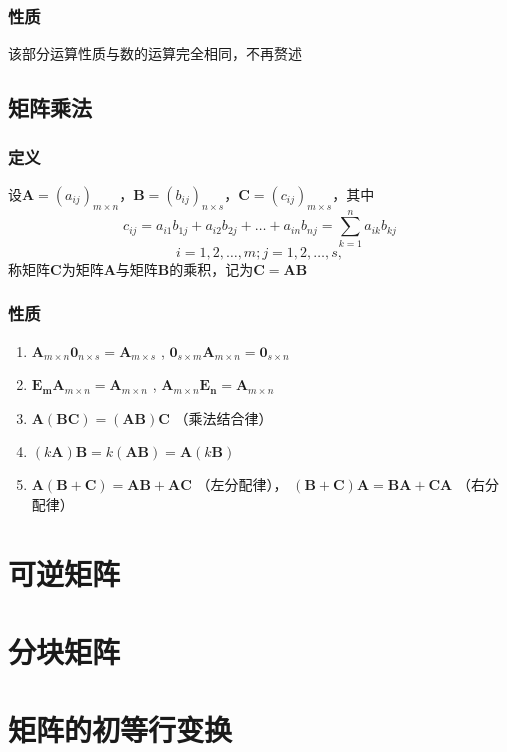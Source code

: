 \documentclass[UTF-8,a4paper]{ctexart}
\begin{document}
\subsubsection{性质} 该部分运算性质与数的运算完全相同，不再赘述
\subsection{矩阵乘法}
\subsubsection{定义}
设\(\mathbf{A}=(a_{ij})_{m\times n}\)，\(\mathbf{B}=(b_{ij})_{n\times s}\)，\(\mathbf{C}=(c_{ij})_{m\times s}\)，其中
\[c_{ij}=a_{i1}b_{1j}+a_{i2}b_{2j}+\dots +a_{in}b_{nj}=\sum_{k=1}^n a_{ik}b_{kj}\]
\[i=1,2,\dots ,m;j=1,2,\dots,s,\]
称矩阵\(\mathbf{C}\)为矩阵\(\mathbf{A}\)与矩阵\(\mathbf{B}\)的乘积，记为\(\mathbf{C}=\mathbf{A}\mathbf{B}\)
\subsubsection{性质}
\begin{enumerate}
    \item \(\mathbf{A}_{m\times n}\mathbf{0}_{n\times s}=\mathbf{A}_{m\times s}\)  ,  \(\mathbf{0}_{s\times m}\mathbf{A}_{m\times n}=\mathbf{0}_{s\times n}\)
    \item \(\mathbf{E_m}\mathbf{A}_{m\times n}=\mathbf{A}_{m\times n}\)     ,     \(\mathbf{A}_{m\times n}\mathbf{E_n}=\mathbf{A}_{m\times n}\)
    \item \(\mathbf{A}(\mathbf{B}\mathbf{C})=(\mathbf{A}\mathbf{B})\mathbf{C}\) （乘法结合律）
    \item \((k\mathbf{A})\mathbf{B}=k(\mathbf{A}\mathbf{B})=\mathbf{A}(k\mathbf{B})\)
    \item \(\mathbf{A}(\mathbf{B}+\mathbf{C})=\mathbf{A}\mathbf{B}+\mathbf{A}\mathbf{C}\) （左分配律）， \((\mathbf{B}+\mathbf{C})\mathbf{A}=\mathbf{B}\mathbf{A}+\mathbf{C}\mathbf{A}\) （右分配律）
\end{enumerate}
\section{可逆矩阵}
\section{分块矩阵}


\section{矩阵的初等行变换}
\end{document}
